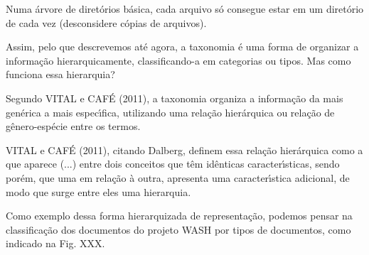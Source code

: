 \documentclass[
12pt,		%
openright,	%
twoside,  %
a4paper,			%
chapter=TITLE,		%
english,			%
french,				%
spanish,			%
brazil				%
]{USPSC-classe/USPSC}
\begin{document}
Numa \'arvore de diret\'orios b\'asica, cada arquivo s\'o consegue estar em um diret\'orio de cada vez (desconsidere c\'opias de arquivos).










Assim, pelo que descrevemos at\'e agora, a taxonomia \'e uma forma de organizar a informa\c{c}\~ao hierarquicamente, classificando-a em categorias ou tipos. Mas como funciona essa hierarquia?










Segundo  VITAL e CAF\'E (2011), \textquotedbl a taxonomia organiza a informa\c{c}\~ao da mais gen\'erica a mais espec\'{\i}fica, utilizando uma rela\c{c}\~ao hier\'arquica ou rela\c{c}\~ao de g\^enero-esp\'ecie entre os termos\textquotedbl .










 VITAL e CAF\'E (2011), citando Dalberg, definem essa rela\c{c}\~ao hier\'arquica como a que aparece \textquotedbl (...) entre dois conceitos que t\^em id\^enticas caracter\'{\i}sticas, sendo por\'em, que uma em rela\c{c}\~ao \`a outra, apresenta uma caracter\'{\i}stica adicional, de modo que surge entre eles uma hierarquia\textquotedbl .










Como exemplo dessa forma hierarquizada de representa\c{c}\~ao, podemos pensar na classifica\c{c}\~ao dos documentos do projeto WASH por tipos de documentos, como indicado na Fig. XXX.
\end{document}
